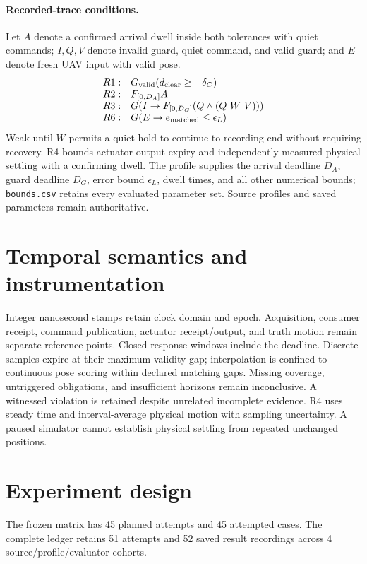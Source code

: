 \documentclass[10pt]{article}
\begin{document}
\paragraph{Recorded-trace conditions.}
Let \(A\) denote a confirmed arrival dwell inside both tolerances with quiet commands;
\(I,Q,V\) denote invalid guard, quiet command, and valid guard; and \(E\) denote fresh UAV input with valid pose.
\[
\begin{array}{ll}
R1:&G_{\rm valid}(d_{\rm clear}\geq-\delta_C)\\
R2:&F_{[0,D_A]}A\\
R3:&G(I\rightarrow F_{[0,D_G]}(Q\land(Q\ W\ V)))\\
R6:&G(E\rightarrow e_{\rm matched}\leq\epsilon_L)
\end{array}
\]
Weak until \(W\) permits a quiet hold to continue to recording end without requiring recovery.
R4 bounds actuator-output expiry and independently measured physical settling with a confirming dwell.
The profile supplies the arrival deadline $D_A$, guard deadline $D_G$, error bound $\epsilon_L$, dwell times, and all other numerical bounds; \texttt{bounds.csv} retains every evaluated parameter set.
Source profiles and saved parameters remain authoritative.
\section{Temporal semantics and instrumentation}
Integer nanosecond stamps retain clock domain and epoch. Acquisition, consumer receipt,
command publication, actuator receipt/output, and truth motion remain separate reference points.
Closed response windows include the deadline. Discrete samples expire at their maximum validity gap;
interpolation is confined to continuous pose scoring within declared matching gaps.
Missing coverage, untriggered obligations, and insufficient horizons remain inconclusive.
A witnessed violation is retained despite unrelated incomplete evidence.
R4 uses steady time and interval-average physical motion with sampling uncertainty.
A paused simulator cannot establish physical settling from repeated unchanged positions.
\section{Experiment design}
The frozen matrix has 45 planned attempts and 45 attempted cases. The complete ledger retains 51 attempts and 52 saved result recordings across 4 source/profile/evaluator cohorts.
\end{document}

